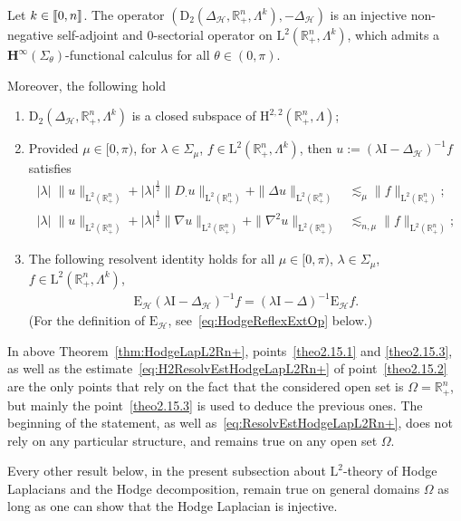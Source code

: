 \documentclass[AHL,Unicode,longabstracts,published]{cedram}
\newcommand{\bbR}{\mathbb{R}}
\newcommand{\rmH}{\mathrm{H}}%
\newcommand{\rmD}{\mathrm{D}}
\newcommand{\rmL}{\mathrm{L}}
\newcommand{\rmE}{\mathrm{E}}
\newcommand{\rmI}{\mathrm{I}}
\newcommand{\clH}{\mathcal{H}}
\newcommand{\bfH}{\mathbf{H}}
\newcommand{\llbracket}{\mathopen{[\mkern -2.7mu[}}
\newcommand{\rrbracket}{\mathclose{]\mkern -2.7mu]}}
\newcommand{\llb}{\llbracket}
\newcommand{\rrb}{\rrbracket}
\newcommand*{\romanenumi}{\renewcommand*{\theenumi}{\roman{enumi}}}
\begin{document}
\begin{theo}\label{thm:HodgeLapL2Rn+}
Let $k\in\llb 0,n\rrb$. The operator $(\rmD_2(\Delta_\clH,\bbR^n_+,\Lambda^k),-\Delta_\clH)$ is an injective non-negative self-adjoint and $0$-sectorial operator on $\rmL^2(\bbR^n_+,\Lambda^k)$, which admits a $\bfH^\infty(\Sigma_\theta)$-functional calculus for all $\theta\in(0,\pi)$.


Moreover, the following hold
\begin{enumerate}\romanenumi
\item\label{theo2.15.1} $\rmD_2(\Delta_\clH,\bbR^n_+,\Lambda^k)$ is a closed subspace of $\rmH^{2,2}(\bbR^n_+,\Lambda)$;
\item\label{theo2.15.2} Provided $\mu\in [0,\pi)$, for $\lambda\in\Sigma_\mu$, $f\in\rmL^2(\bbR^n_+,\Lambda^k)$, then $u:=(\lambda\rmI -\Delta_\clH)^{-1}f $ satisfies
\begin{align}
|\lambda|\;\| u\|_{{\rmL}^{2}\left(\bbR^n_+\right)}+|\lambda|^\frac{1}{2}\| D_{\cdot} u\|_{{\rmL}^{2}\left(\bbR^n_+\right)}+\| \Delta u\|_{{\rmL}^{2}\left(\bbR^n_+\right)} &\lesssim_{\mu} \| f\|_{{\rmL}^{2}\left(\bbR^n_+\right)} ;\label{eq:ResolvEstHodgeLapL2Rn+}
\\
|\lambda|\;\| u\|_{{\rmL}^{2}\left(\bbR^n_+\right)}+|\lambda|^\frac{1}{2}\| \nabla u\|_{{\rmL}^{2}\left(\bbR^n_+\right)}+\| \nabla^2 u\|_{{\rmL}^{2}\left(\bbR^n_+\right)} &\lesssim_{n,\mu} \| f\|_{{\rmL}^{2}\left(\bbR^n_+\right)} \label{eq:H2ResolvEstHodgeLapL2Rn+}
;
\end{align}
\item\label{theo2.15.3} The following resolvent identity holds for all $\mu\in [0,\pi)$, $\lambda\in\Sigma_\mu$, $f\in\rmL^2(\bbR^n_+,\Lambda^k)$,
\begin{align*}
\rmE_\clH(\lambda\rmI -\Delta_\clH)^{-1}f = (\lambda\rmI -\Delta)^{-1}\rmE_\clH f.
\end{align*}
(For the definition of $\rmE_\clH$, see~\eqref{eq:HodgeReflexExtOp} below.)
\end{enumerate}
\end{theo}


\begin{rema}
In above Theorem~\ref{thm:HodgeLapL2Rn+}, points~\eqref{theo2.15.1} and \eqref{theo2.15.3}, as well as the estimate~\eqref{eq:H2ResolvEstHodgeLapL2Rn+} of point~\eqref{theo2.15.2} are the only points that rely on the fact that the considered open set is $\Omega=\bbR^n_+$, but mainly the point~\eqref{theo2.15.3} is used to deduce the previous ones.
The beginning of the statement, as well as~\eqref{eq:ResolvEstHodgeLapL2Rn+}, does not rely on any particular structure, and remains true on any open set $\Omega$.

Every other result below, in the present subsection about $\rmL^2$-theory of Hodge Laplacians and the Hodge decomposition, remain true on general domains $\Omega$ as long as one can show that the Hodge Laplacian is injective.
\end{rema}
\end{document}
